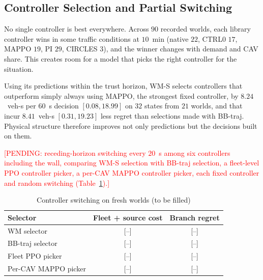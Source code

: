 \documentclass[conference]{IEEEtran}
\newcommand{\pending}[1]{\textcolor{red}{[PENDING: #1]}}
\begin{document}
\subsection{Controller Selection and Partial Switching}
No single controller is best everywhere. Across $90$ recorded worlds, each library controller wins in some traffic conditions at $10$~min (native $22$, CTRL0 $17$, MAPPO $19$, PI $29$, CIRCLES $3$), and the winner changes with demand and CAV share. %
This creates room for a model that picks the right controller for the situation.

Using its predictions within the trust horizon, WM-S selects controllers that outperform simply always using MAPPO, the strongest fixed controller, by $8.24$~veh-s per $60$~s decision $[0.08,18.99]$ on $32$ states from $21$ worlds, and that incur $8.41$~veh-s $[0.31,19.23]$ less regret than selections made with BB-traj. %
Physical structure therefore improves not only predictions but the decisions built on them.

\pending{receding-horizon switching every $20$~s among six controllers including the wall, comparing WM-S selection with BB-traj selection, a fleet-level PPO controller picker, a per-CAV MAPPO controller picker, each fixed controller and random switching (Table~\ref{tab:pending}).} %

\begin{table}[t]
\caption{Controller switching on fresh worlds (to be filled)}
\label{tab:pending}
\centering
\begin{tabular}{lcc}
\hline
Selector & Fleet + source cost & Branch regret\\
\hline
WM selector & [--] & [--]\\
BB-traj selector & [--] & [--]\\
Fleet PPO picker & [--] & [--]\\
Per-CAV MAPPO picker & [--] & [--]\\
\hline
\end{tabular}
\end{table}
\end{document}
